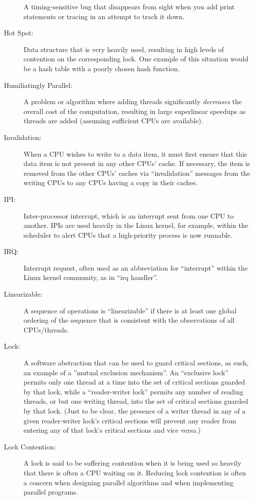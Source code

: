 \begin{description}
	A timing-sensitive bug that disappears from sight when you
	add print statements or tracing in an attempt to track it
	down.
\item[Hot Spot:]
	Data structure that is very heavily used, resulting in high
	levels of contention on the corresponding lock.
	One example of this situation would be a hash table with
	a poorly chosen hash function.
\item[Humiliatingly Parallel:]
	A problem or algorithm where adding threads significantly
	\emph{decreases} the overall cost of the computation, resulting in
	large superlinear speedups as threads are added (assuming sufficient
	CPUs are available).
\item[Invalidation:]
	When a CPU wishes to write to a data item, it must first ensure
	that this data item is not present in any other CPUs' cache.
	If necessary, the item is removed from the other CPUs' caches
	via ``invalidation'' messages from the writing CPUs to any
	CPUs having a copy in their caches.
\item[IPI:]
	Inter-processor interrupt, which is an
	interrupt sent from one CPU to another.
	IPIs are used heavily in the Linux kernel, for example, within
	the scheduler to alert CPUs that a high-priority process is now
	runnable.
\item[IRQ:]
	Interrupt request, often used as an abbreviation for ``interrupt''
	within the Linux kernel community, as in ``irq handler''.
\item[Linearizable:]
	A sequence of operations is ``linearizable'' if there is at
	least one global ordering of the sequence that is consistent
	with the observations of all CPUs/threads.
\item[Lock:]
	A software abstraction that can be used to guard critical sections,
	as such, an example of a ''mutual exclusion mechanism''.
	An ``exclusive lock'' permits only one thread at a time into the
	set of critical sections guarded by that lock, while a
	``reader-writer lock'' permits any number of reading
	threads, or but one writing thread, into the set of critical
	sections guarded by that lock.  (Just to be clear, the presence
	of a writer thread in any of a given reader-writer lock's
	critical sections will prevent any reader from entering
	any of that lock's critical sections and vice versa.)
\item[Lock Contention:]
	A lock is said to be suffering contention when it is being
	used so heavily that there is often a CPU waiting on it.
	Reducing lock contention is often a concern when designing
	parallel algorithms and when implementing parallel programs.

\end{description}
